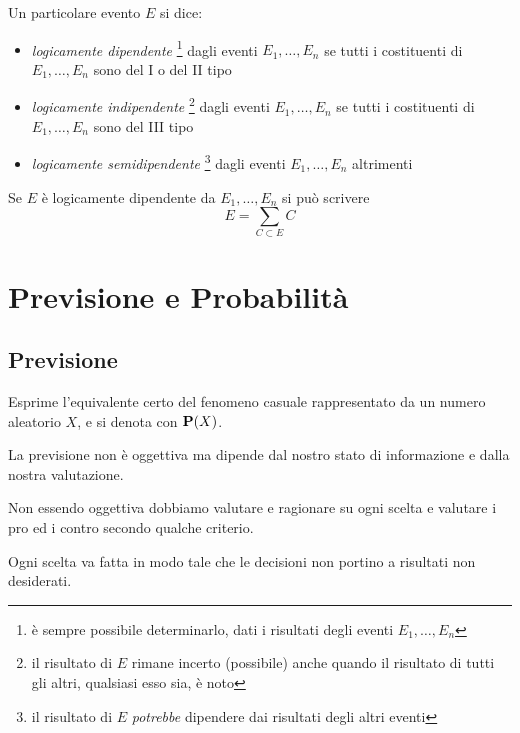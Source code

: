 \begin{definition}
  Un particolare evento $E$ si dice:
  \begin{itemize}
  \item \emph{logicamente dipendente}
  \footnote{è sempre possibile determinarlo, dati i risultati degli eventi \( E_1, \ldots, E_n \)}
  dagli eventi \( E_1, \ldots, E_n \) se tutti i costituenti di \( E_1, \ldots, E_n \) sono del I o del II tipo
  \item \emph{logicamente indipendente}
  \footnote{il risultato di $E$ rimane incerto (possibile) anche quando il risultato di tutti gli altri, qualsiasi esso sia, è noto}
  dagli eventi \( E_1, \ldots, E_n \) se tutti i costituenti di \( E_1, \ldots, E_n \) sono del III tipo
  \item \emph{logicamente semidipendente}
  \footnote{il risultato di $E$ \emph{potrebbe} dipendere dai risultati degli altri eventi}
  dagli eventi \( E_1, \ldots, E_n \) altrimenti
  \end{itemize}
\end{definition}

Se $E$ è logicamente dipendente da \( E_1, \ldots, E_n \) si può scrivere
\[ E = \sum_{C \subset E} C \]

\section{Previsione e Probabilità}
\subsection{Previsione}
\begin{definition}[Previsione]
  Esprime l'equivalente certo del fenomeno casuale rappresentato da un numero aleatorio $X$, e si denota con $\mathbf{P}(X)$.

  La previsione non è oggettiva ma dipende dal nostro stato di informazione e dalla nostra valutazione.
\end{definition}

Non essendo oggettiva dobbiamo valutare e ragionare su ogni scelta e valutare i pro ed i contro secondo qualche criterio.

\begin{definition}\label{def:coerenza}
  Ogni scelta va fatta in modo tale che le decisioni non portino a risultati non desiderati.
\end{definition}

